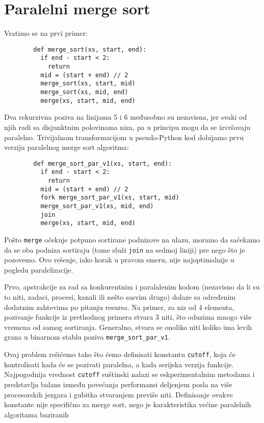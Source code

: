 \documentclass[a4paper,11pt]{article}
\begin{document}
    \section{Paralelni merge sort}
    Vratimo se na prvi primer:
    \begin{verbatim}
        def merge_sort(xs, start, end):
          if end - start < 2:
            return
          mid = (start + end) // 2
          merge_sort(xs, start, mid)
          merge_sort(xs, mid, end)
          merge(xs, start, mid, end)
    \end{verbatim}
    Dva rekurzivna poziva na linijama 5 i 6 međusobno su nezavisna, jer svaki od njih radi sa disjunktnim
    polovinama niza, pa u principu mogu da se izvršavaju paralelno. Trivijalnom transformacijom u pseudo-Python
    kod dobijamo prvu verziju paralelnog merge sort algoritma:
    \begin{verbatim}
        def merge_sort_par_v1(xs, start, end):
          if end - start < 2:
            return
          mid = (start + end) // 2
          fork merge_sort_par_v1(xs, start, mid)
          merge_sort_par_v1(xs, mid, end)
          join
          merge(xs, start, mid, end)
    \end{verbatim}
    Pošto \verb|merge| očekuje potpuno sortirane podnizove na ulazu, moramo da sačekamo da se oba
    podniza sortiraju (tome služi \verb|join| na sedmoj liniji) pre nego što je pozovemo.
    Ovo rešenje, iako korak u pravom smeru, nije najoptimalnije u pogledu paralelizacije.\par
    Prvo, apstrakcije za rad sa konkurentnim i paralalenim kodom (nezavisno da li su to niti,
    zadaci, procesi, kanali ili nešto sasvim drugo) dolaze sa određenim dodatnim zahtevima po pitanju resursa.
    Na primer, za niz od 4 elementa, pozivanje funkcije iz prethodnog primera stvara 3 niti, što oduzima
    mnogo više vremena od samog sortiranja. Generalno, stvara se onoliko niti koliko ima levih grana
    u binarnom stablu poziva \verb|merge_sort_par_v1|.\par 
    Ovaj problem rešićemo tako što ćemo definisati konstantu \verb|cutoff|, koja će kontrolisati kada
    će se pozivati paralelna, a kada serijska verzija funkcije. Najpogodnija vrednost \verb|cutoff|
    suštinski nalazi se eskperimentalnim metodama i predstavlja balans između povećanja performansi
    deljenjem posla na više procesorskih jezgara i gubitka stvaranjem previše niti. Definisanje ovakve
    konstante nije specifično za merge sort, nego je karakteristika većine paralelnih algoritama baziranih
\end{document}
